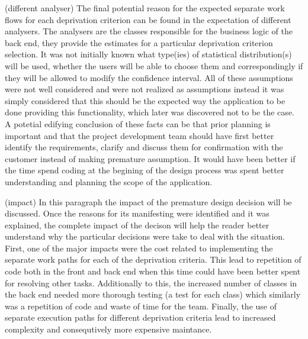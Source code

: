 \documentclass{l3proj}
\begin{document}
(different analyser)
The final potential reason for the expected separate work flows for each deprivation criterion can be found in the expectation of different analysers. The analysers are the classes responsible for the business logic of the back end, they provide the estimates for a particular deprivation criterion selection. It was not initially known what type(ies) of statistical distribution(s) will be used, whether the users will be able to choose them and correspondingly if they will be allowed to modify the confidence interval.  All of these assumptions were not well considered and were not realized as assumptions instead it was simply considered that this should be the expected way the application to be done providing this functionality, which later was discovered not to be the case. A potetial edifying conclusion of these facts can be that prior planning is important and that the project development team should have first better identify the requirements, clarify and discuss them for confirmation with the customer instead of making premature assumption. It would have been better if the time spend coding at the begining of the design process was spent better understanding and planning the scope of the application.

(impact)
In this paragraph the impact of the premature design decision will be discussed. Once the reasons for its manifesting were identified and it was explained, the complete impact of the decison will help the reader better understand why the particular decisions were take to deal with the situation. First, one of the major impacts were the cost related to implementing the separate work paths for each of the deprivation criteria. This lead to repetition of code both in the front and back end when this time could have been better spent for resolving other tasks. Additionally to this, the increased number of classes in the back end needed more thorough testing (a test for each class) which similarly was a repetition of code and waste of time for the team. Finally, the use of separate execution paths for different deprivation criteria lead to increased complexity and consequtively more expensive maintance.
\end{document}
